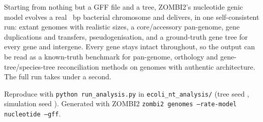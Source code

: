\documentclass[11pt]{article}
\begin{document}
Starting from nothing but a GFF file and a tree, ZOMBI2's nucleotide genic model evolves a real
\EcChromLen~bp bacterial chromosome and delivers, in one self-consistent run: extant genomes with
realistic sizes, a core/accessory pan-genome, gene duplications and transfers, pseudogenisation, and
a ground-truth gene tree for every gene and intergene. Every gene stays intact throughout, so the
output can be read as a known-truth benchmark for pan-genome, orthology and gene-tree/species-tree
reconciliation methods on genomes with authentic architecture. The full run takes under a second.

\vfill
{\footnotesize\color{muted}Reproduce with \texttt{python run\_analysis.py} in
\texttt{ecoli\_nt\_analysis/} (tree seed \EcTreeSeed, simulation seed \EcSimSeed). Generated with
ZOMBI2 \texttt{zombi2 genomes --rate-model nucleotide --gff}.}
\end{document}
